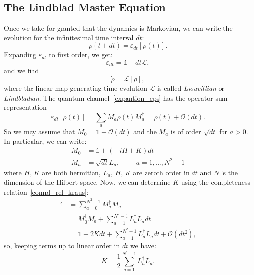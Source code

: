 \subsection{The Lindblad Master Equation}
Once we take for granted that the dynamics is Markovian, we can write the evolution for the infinitesimal time interval $dt$:
\begin{equation}
    \rho(t+dt) = \varepsilon_{dt}[\rho(t)].
\end{equation}
Expanding $\varepsilon_{dt}$ to first order, we get:
\begin{equation}
\label{expantion_eps}
    \varepsilon_{dt} = \mathds{1} + dt\mathcal{L},
\end{equation}
and we find
\begin{equation}
    \Dot{\rho} = \mathcal{L}[\rho],
\end{equation}
where the linear map generating time evolution $\mathcal{L}$ is called \emph{Liouvillian} or \emph{Lindbladian}. 
The quantum channel~\ref{expantion_eps} has the operator-sum representation
\begin{equation}
\label{op_sum_repr}
    \varepsilon_{dt}[\rho(t)] = \sum_a M_a \rho(t) M_a^\dagger = \rho(t) + \mathcal{O}(dt).
\end{equation}
So we may assume that $M_0 = \mathds{1} + \mathcal{O}(dt)$ and the $M_a$ is of order $\sqrt{dt}$ for $a>0$. In particular, we can write:
\begin{align}
    M_0 &= \mathds{1} + (-iH+K)dt \\
    M_a &= \sqrt{dt}L_a, \hspace{1cm} a = 1,\dots,N^2-1
\end{align}
where $H$, $K$ are both hermitian, $L_a$, $H$, $K$ are zeroth order in $dt$ and $N$ is the dimension of the Hilbert space.
Now, we can determine $K$ using the completeness relation~\ref{compl_rel_kraus}:
\begin{equation}
\begin{split}
    \mathds{1} &= \sum_{a=0}^{N^2-1} M_a^\dagger M_a \\
               &= M_0^\dagger M_0 + \sum_{a=1}^{N^2-1} L_a^\dagger L_a dt \\
               &= \mathds{1} +2Kdt + \sum_{a=1}^{N^2-1} L_a^\dagger L_a dt + \mathcal{O}(dt^2),
\end{split}
\end{equation}
so, keeping terms up to linear order in $dt$ we have:
\begin{equation*}
    K = \frac{1}{2} \sum_{a=1}^{N^2-1} L_a^\dagger L_a.
\end{equation*}

